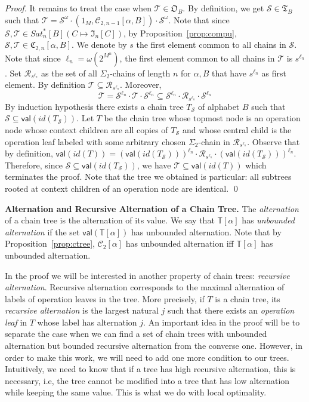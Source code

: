 \documentclass[envcountsame]{llncs}
\newcommand\Cs{\ensuremath{\mathcal{C}}\xspace}
\newcommand\Cstwo{\ensuremath{\Cs_2}\xspace}
\newcommand\Cstwolen[1]{\ensuremath{\Cs_{2,#1}}\xspace}
\newcommand\fCtwolen[1]{\ensuremath{\fC_{2,#1}}\xspace}
\newcommand\Ss{\ensuremath{\mathcal{S}}\xspace}
\newcommand\Ts{\ensuremath{\mathcal{T}}\xspace}
\newcommand\Rs{\ensuremath{\mathcal{R}}\xspace}
\newcommand\ct{\ensuremath{\mathbb{T}}\xspace}
\newcommand{\sic}[1]{\ensuremath{\Sigma_{#1}}\xspace}
\newcommand\val[1]{\ensuremath{\textsf{val}(#1)\xspace}}
\newcommand\chain{chain\xspace}
\newcommand\qchain[1]{\ensuremath{\sic{#1}}-chain\xspace}
\newcommand\chains{chains\xspace}
\newcommand\qchains[1]{\ensuremath{\sic{#1}}-chains\xspace}
\newcommand\Chain{Chain\xspace}
\newcommand\dchain{\qchain{2}}
\newcommand\dchains{\qchains{2}}
\newcommand\fI{\ensuremath{\mathfrak I}\xspace}
\newcommand\fC{\ensuremath{\mathfrak C}\xspace}
\newcommand\fO{\ensuremath{\mathfrak O}\xspace}
\newcommand\fT{\ensuremath{\mathfrak T}\xspace}
\begin{document}
\begin{proof}
  It remains to treat the case when $\Ts \in \fO_B$. By definition, we
  get $\Ss \in \fT_B$ such that $\Ts = \Ss^\omega \cdot (1_M,
  \Cstwolen{n-1}[\alpha,B]) \cdot \Ss^{\omega}$. Note that since $\Ss,\Ts
  \in Sat^*_n[B](C \mapsto \fI_n[C])$, by Proposition~\ref{prop:compu},
  $\Ss,\Ts \in \fCtwolen{n}[\alpha,B]$. We denote by $s$ the first element
  common to all \chains in $\Ss$. Note that since $\ell_n =
  \omega(2^{M^n})$, the first element common to all \chains in \Ts is
  $s^{\ell_n}$. Set $\Rs_{s^{\ell_n}}$ as the set of all \dchains of
  length $n$ for $\alpha,B$ that have $s^{\ell_n}$ as first element. By
  definition $\Ts \subseteq \Rs_{s^{\ell_n}}$. Moreover,
  \[
  \Ts = \Ss^{\ell_n} \cdot \Ts \cdot \Ss^{\ell_n} \subseteq \Ss^{\ell_n} \cdot
  \Rs_{s^{\ell_n}} \cdot \Ss^{\ell_n}
  \]
  By induction hypothesis there exists a \chain tree $T_{\Ss}$ of
  alphabet $B$ such that $\Ss \subseteq \val{id(T_{\Ss})}$. Let $T$ be
  the \chain tree whose topmost node is an operation node whose context
  children are all copies of $T_{\Ss}$ and whose central child is the
  operation leaf labeled with some arbitrary chosen \dchain in
  $\Rs_{s^{\ell_n}}$. Observe that by definition, 
  $\val{id(T)} = (\val{id(T_{\Ss})})^{\ell_n} \cdot \Rs_{s^{\ell_n}} \cdot
  (\val{id(T_{\Ss})})^{\ell_n}$. Therefore, since $\Ss \subseteq
  \val{id(T_{\Ss})}$, we have $\Ts \subseteq \val{id(T)}$ which
  terminates the proof. Note that the tree we obtained is particular: all
  subtrees rooted at context children of an operation node are identical. \qed
\end{proof}

\medskip
\noindent
{\bf Alternation and Recursive Alternation of a \Chain Tree.} The
\emph{alternation} of a \chain tree is the alternation of its
value. We say that $\ct[\alpha]$ has \emph{unbounded alternation} if  
the set $\val{\ct[\alpha]}$ has unbounded alternation. Note that by
Proposition~\ref{prop:ctree}, $\Cstwo[\alpha]$ has unbounded
alternation iff $\ct[\alpha]$ has unbounded alternation.

In the proof we will be interested in another property of \chain 
trees: \emph{recursive alternation}. Recursive alternation corresponds
to the maximal alternation of labels of operation leaves in the tree.
More precisely, if $T$ is a \chain tree, its \emph{recursive
  alternation} is the largest natural $j$ such that there exists an
\emph{operation leaf} in $T$ whose label has alternation $j$. An
important idea in the proof will be to separate the case when we can
find a set of \chain trees with unbounded alternation but bounded
recursive alternation from the converse one. However, in order to make
this work, we will need to add one more condition to our
trees. Intuitively, we need to know that if a tree has high recursive
alternation, this is necessary, i.e, the tree cannot be modified into 
a tree that has low alternation while keeping the same value. This is
what we do with local optimality.
\end{document}
